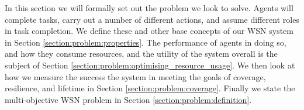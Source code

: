 
In this section we will formally set out the problem we look to solve.  Agents will complete tasks, carry out a number of different actions, and assume different roles in task completion. We define these and other base concepts of our WSN system in Section \ref{section:problem:properties}. The performance of agents in doing so, and how they consume resources, and the utility of the system overall is the subject of Section \ref{section:problem:optimising_resource_usage}. We then look at how we measure the success the system in meeting the goals of coverage, resilience, and lifetime in Section \ref{section:problem:coverage}. Finally we state the multi-objective WSN problem in Section \ref{section:problem:definition}. 